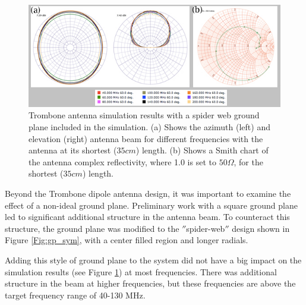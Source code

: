 \begin{figure}[htb]
\begin{center}
\includegraphics[width=0.95\linewidth]{SCIHI_system/figures/trombone_gp.jpg}
\caption{Trombone antenna simulation results with a spider web ground plane included in the simulation. (a) Shows the azimuth (left) and elevation (right) antenna beam for different frequencies with the antenna at its shortest ($35 cm$) length. (b) Shows a Smith chart of the antenna complex reflectivity, where 1.0 is set to $50 \Omega$, for the shortest ($35 cm$) length.}
\label{Fig:trsym_gp}
\end{center}
\end{figure}

Beyond the Trombone dipole antenna design, it was important to examine the effect of a non-ideal ground plane. Preliminary work with a square ground plane led to significant additional structure in the antenna beam. To counteract this structure, the ground plane was modified to the $''$spider-web$''$ design shown in Figure \ref{Fig:gp_sym}, with a center filled region and longer radials. 

Adding this style of ground plane to the system did not have a big impact on the simulation results (see Figure \ref{Fig:trsym_gp}) at most frequencies. There was additional structure in the beam at higher frequencies, but these frequencies are above the target frequency range of 40-130 MHz.  

